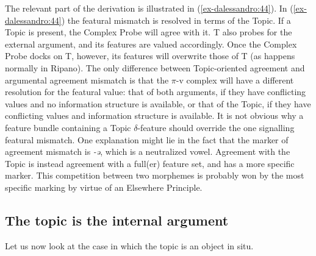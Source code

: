 \documentclass[output=paper
,modfonts
,nonflat]{langsci/langscibook}
\begin{document}
	\begin{exe}
		\ex\label{ex-dalessandro:44}
	\end{exe} 
\noindent The relevant part of the derivation is illustrated in (\ref{ex-dalessandro:44}). In (\ref{ex-dalessandro:44}) the featural mismatch is resolved in terms of the Topic. If a Topic is present, the Complex Probe will agree with it. T also probes for the external argument, and its features are valued accordingly. Once the Complex Probe docks on T, however, its features will overwrite those of T (as happens normally in Ripano). The only difference between Topic-oriented agreement and argumental agreement mismatch is that the $\pi $-v complex will have a different resolution for the featural value: that of both arguments, if they have conflicting values and no information structure is available, or that of the Topic, if they have conflicting values and information structure is available.  
It is not obvious why a feature bundle containing a Topic $\delta $-feature should override the one signalling featural mismatch. One explanation might lie in the fact that the marker of agreement mismatch is \textit{{}-ə}, which is a neutralized vowel. Agreement with the Topic is instead agreement with a full(er) feature set, and has a more specific marker. This competition between two morphemes is probably won by the most specific marking by virtue of an Elsewhere Principle. 

\subsection{The topic is the internal argument}\label{sec-dalessandro:5.2}
Let us now look at the case in which the topic is an object in situ. 
\end{document}
